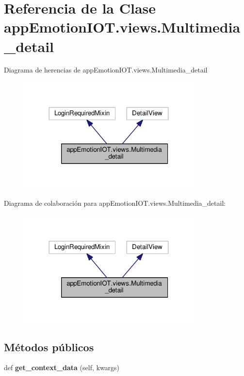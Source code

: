 \hypertarget{classappEmotionIOT_1_1views_1_1Multimedia__detail}{}\section{Referencia de la Clase app\+Emotion\+I\+O\+T.\+views.\+Multimedia\+\_\+detail}
\label{classappEmotionIOT_1_1views_1_1Multimedia__detail}


Diagrama de herencias de app\+Emotion\+I\+O\+T.\+views.\+Multimedia\+\_\+detail
\nopagebreak
\begin{figure}[H]
\begin{center}
\leavevmode
\includegraphics[width=264pt]{classappEmotionIOT_1_1views_1_1Multimedia__detail__inherit__graph}
\end{center}
\end{figure}


Diagrama de colaboración para app\+Emotion\+I\+O\+T.\+views.\+Multimedia\+\_\+detail\+:
\nopagebreak
\begin{figure}[H]
\begin{center}
\leavevmode
\includegraphics[width=264pt]{classappEmotionIOT_1_1views_1_1Multimedia__detail__coll__graph}
\end{center}
\end{figure}
\subsection*{Métodos públicos}
\begin{DoxyCompactItemize}
\item 
def {\bfseries get\+\_\+context\+\_\+data} (self, kwargs)\hypertarget{classappEmotionIOT_1_1views_1_1Multimedia__detail_aa41b129db4eca9593556d6086a31fb72}{}\label{classappEmotionIOT_1_1views_1_1Multimedia__detail_aa41b129db4eca9593556d6086a31fb72}

\end{DoxyCompactItemize}
